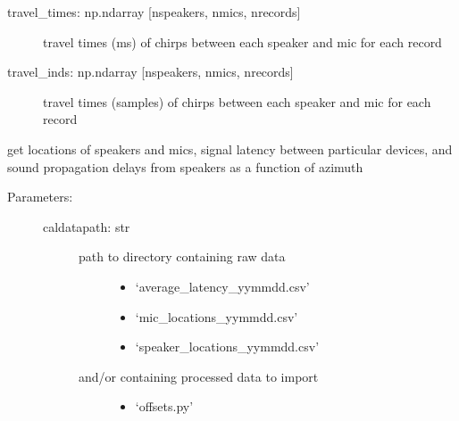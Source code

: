 \documentclass[letterpaper,10pt,english]{sphinxmanual}
\begin{document}
\begin{fulllineitems}
\begin{fulllineitems}
\begin{description}
\begin{description}
\item[{travel\_times: np.ndarray {[}nspeakers, nmics, nrecords{]}}] \leavevmode
travel times (ms) of chirps between each speaker and mic for each record

\item[{travel\_inds: np.ndarray {[}nspeakers, nmics, nrecords{]}}] \leavevmode
travel times (samples) of chirps between each speaker and mic for each record

\end{description}

\end{description}

\end{fulllineitems}


\begin{fulllineitems}
\label{\detokenize{code:ATom.atom_functions.dataset.get_calibration_info}}
get locations of speakers and mics, signal latency between particular devices,
and sound propagation delays from speakers as a function of azimuth
\begin{description}
\item[{Parameters:}] \leavevmode\begin{description}
\item[{caldatapath: str}] \leavevmode\begin{description}
\item[{path to directory containing raw data}] \leavevmode\begin{itemize}
\item {} 
‘average\_latency\_yymmdd.csv’

\item {} 
‘mic\_locations\_yymmdd.csv’

\item {} 
‘speaker\_locations\_yymmdd.csv’

\end{itemize}

\item[{and/or containing processed data to import}] \leavevmode\begin{itemize}
\item {} 
‘offsets.py’

\end{itemize}

\end{description}


\end{description}
\end{description}
\end{fulllineitems}
\end{fulllineitems}
\end{document}
